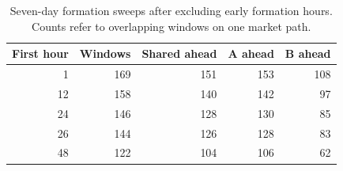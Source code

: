 \begin{table}[htbp]
\centering\small
\caption{Seven-day formation sweeps after excluding early formation hours. Counts refer to overlapping windows on one market path.}
\label{tab:feedbackearly}
\begin{tabular}{rrrrr}
\toprule
First hour & Windows & Shared ahead & A ahead & B ahead \\
\midrule
1 & 169 & 151 & 153 & 108 \\
12 & 158 & 140 & 142 & 97 \\
24 & 146 & 128 & 130 & 85 \\
26 & 144 & 126 & 128 & 83 \\
48 & 122 & 104 & 106 & 62 \\
\bottomrule
\end{tabular}
\end{table}
